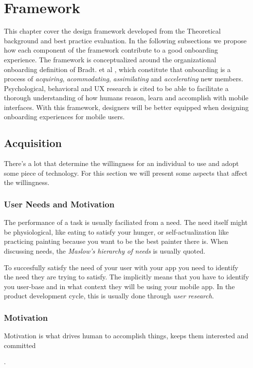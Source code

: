 \chapter{Framework}
\label{chap:framework}

This chapter cover the design framework developed from the Theoretical background and best practice evaluation. In the following subsections we propose how each component of the framework contribute to a good onboarding experience. The framework is conceptualized around the organizational onboarding definition of Bradt. et al \cite{Bradt2009}, which constitute that onboarding is a process of \textit{acquiring}, \textit{acommodating}, \textit{assimilating} and \textit{accelerating} new members. Psychological, behavioral and UX research is cited to be able to facilitate a thorough understanding of how humans reason, learn and accomplish with mobile interfaces. With this framework, designers will be better equipped when designing onboarding experiences for mobile users.

\section{Acquisition}
There's a lot that determine the willingness for an individual to use and adopt some piece of technology. For this section we will present some aspects that affect the willingness.

\subsection{User Needs and Motivation}

The performance of a task is usually faciliated from a need. The need itself might be physiological, like eating to satisfy your hunger, or self-actualization like practicing painting because you want to be the best painter there is. When discussing needs, the \textit{Maslow's hierarchy of needs} is usually quoted.


To succesfully satisfy the need of your user with your app you need to identify the need they are trying to satisfy. The implicitly means that you have to identify you user-base and in what context they will be using your mobile app. In the product development cycle, this is usually done through \textit{user research}.

\subsection{Motivation}
Motivation is what drives human to accomplish things, keeps them interested and committed .

